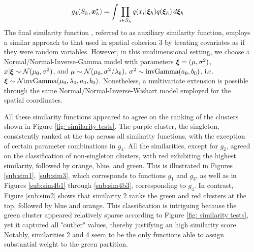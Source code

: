 \documentclass[12pt,	%
	a4paper,		%
	twoside,		%
	openright,		%
	titlepage,%
	]{book}
\theoremstyle{definition}
\let\cite\citep
\begin{document}


\begin{equation}    
g_4(S_h,\boldsymbol{x}_{h}^\star) = \int \prod_{i \in S_h} q(x_i|\boldsymbol{\xi}_h) q(\boldsymbol{\xi}_h) \, d\boldsymbol{\xi}_h
\end{equation}
The final similarity function \cite{paper-3}, referred to as auxiliary similarity function, employs a similar approach to that used in spatial cohesion 3 by treating covariates as if they were random variables. However, in this unidimensional setting, we choose a Normal/Normal-Inverse-Gamma model with parameters $\boldsymbol{\xi} = (\mu,\sigma^2)$, $x|\boldsymbol{\xi} \sim \mathcal{N}(\mu_0,\sigma^2)$, and $\mu \sim \mathcal{N}(\mu_0, \sigma^2/\lambda_0)$, $\sigma^2 \sim \text{invGamma}(a_0,b_0)$, i.e. $\boldsymbol{\xi} \sim \mathcal{N}\text{invGamma}(\mu_0, \lambda_0, a_0, b_0)$. Nonetheless, a multivariate extension is possible through the same Normal/Normal-Inverse-Wishart model employed for the spatial coordinates.

All these similarity functions appeared to agree on the ranking of the clusters shown in Figure \ref{fig: similarity tests}. The purple cluster, the singleton, consistently ranked at the top across all similarity functions, with the exception of certain parameter combinations in $g_4$. All the similarities, except for $g_2$, agreed on the classification of non-singleton clusters, with red exhibiting the highest similarity, followed by orange, blue, and green. This is illustrated in Figures \ref{sub:sim1}, \ref{sub:sim3}, which corresponds to functions $g_1$ and $g_3$, as well as in Figures \ref{sub:sim4b1} through \ref{sub:sim4b3}, corresponding to $g_4$. In contrast, Figure \ref{sub:sim2} shows that similarity 2 ranks the green and red clusters at the top, followed by blue and orange. This classification is intriguing because the green cluster appeared relatively sparse according to Figure \ref{fig: similarity tests}, yet it captured all "outlier" values, thereby justifying an high similarity score. Notably, similarities 2 and 4 seem to be the only functions able to assign substantial weight to the green partition.
\end{document}
